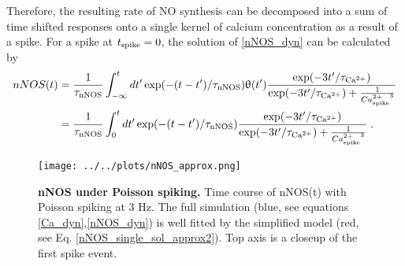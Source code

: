 \documentclass[10pt,letterpaper]{article}
\begin{document}
Therefore, the resulting rate of NO synthesis can be decomposed into a sum of time shifted responses onto a single kernel of calcium concentration as a result of a spike. For a spike at $t_{\rm spike}=0$, the solution of \eqref{nNOS_dyn} can be calculated by
\begin{equation}
\begin{split}
nNOS(t) &= \frac{1}{\tau_{\rm nNOS}}\int_{-\infty}^t dt' \exp(-(t-t')/\tau_{\rm nNOS}) \uptheta(t') \frac{\exp(-3t'/\tau_{\rm Ca^{2+}})}{\exp(-3t'/\tau_{\rm Ca^{2+}}) + \frac{1}{{Ca^{2+}_{\rm spike}}^3}} \\
&= \frac{1}{\tau_{\rm nNOS}}\int_{0}^t dt' \exp(-(t-t')/\tau_{\rm nNOS}) \frac{\exp(-3t'/\tau_{\rm Ca^{2+}})}{\exp(-3t'/\tau_{\rm Ca^{2+}}) + \frac{1}{{Ca^{2+}_{\rm spike}}^3}}\;.
\end{split}\label{nNOS_single_sol}
\end{equation}

\begin{figure}
\begin{center}
\texttt{[image: ../../plots/nNOS\_approx.png]}
\end{center}
\caption{{\bf nNOS under Poisson spiking.} Time course of nNOS(t) with Poisson spiking at 3 Hz. The full simulation (blue, see equations \eqref{Ca_dyn},\eqref{nNOS_dyn}) is well fitted by the simplified model (red, see Eq. \eqref{nNOS_single_sol_approx2}). Top axis is a closeup of the first spike event.}
\label{nNOS_approx_plot}
\end{figure}
\end{document}
